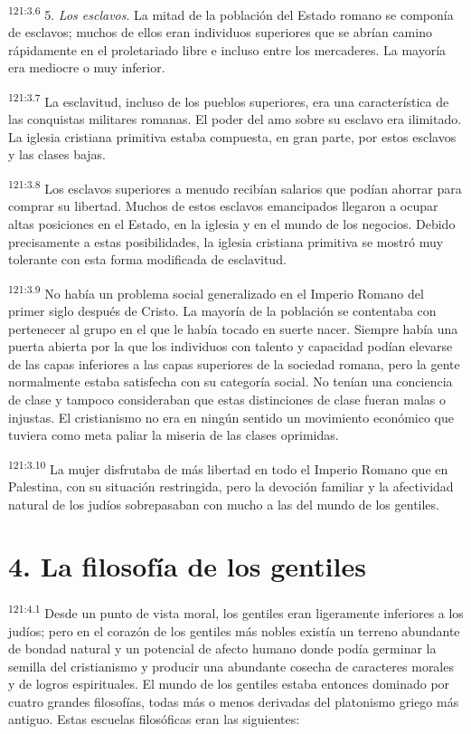 \par
\textsuperscript{121:3.6} 5. \textit{Los esclavos}. La mitad de la población del Estado romano se componía de esclavos; muchos de ellos eran individuos superiores que se abrían camino rápidamente en el proletariado libre e incluso entre los mercaderes. La mayoría era mediocre o muy inferior.

\par
\textsuperscript{121:3.7} La esclavitud, incluso de los pueblos superiores, era una característica de las conquistas militares romanas. El poder del amo sobre su esclavo era ilimitado. La iglesia cristiana primitiva estaba compuesta, en gran parte, por estos esclavos y las clases bajas.

\par
\textsuperscript{121:3.8} Los esclavos superiores a menudo recibían salarios que podían ahorrar para comprar su libertad. Muchos de estos esclavos emancipados llegaron a ocupar altas posiciones en el Estado, en la iglesia y en el mundo de los negocios. Debido precisamente a estas posibilidades, la iglesia cristiana primitiva se mostró muy tolerante con esta forma modificada de esclavitud.

\par
\textsuperscript{121:3.9} No había un problema social generalizado en el Imperio Romano del primer siglo después de Cristo. La mayoría de la población se contentaba con pertenecer al grupo en el que le había tocado en suerte nacer. Siempre había una puerta abierta por la que los individuos con talento y capacidad podían elevarse de las capas inferiores a las capas superiores de la sociedad romana, pero la gente normalmente estaba satisfecha con su categoría social. No tenían una conciencia de clase y tampoco consideraban que estas distinciones de clase fueran malas o injustas. El cristianismo no era en ningún sentido un movimiento económico que tuviera como meta paliar la miseria de las clases oprimidas.

\par
\textsuperscript{121:3.10} La mujer disfrutaba de más libertad en todo el Imperio Romano que en Palestina, con su situación restringida, pero la devoción familiar y la afectividad natural de los judíos sobrepasaban con mucho a las del mundo de los gentiles.

\section*{4. La filosofía de los gentiles}
\par
\textsuperscript{121:4.1} Desde un punto de vista moral, los gentiles eran ligeramente inferiores a los judíos; pero en el corazón de los gentiles más nobles existía un terreno abundante de bondad natural y un potencial de afecto humano donde podía germinar la semilla del cristianismo y producir una abundante cosecha de caracteres morales y de logros espirituales. El mundo de los gentiles estaba entonces dominado por cuatro grandes filosofías, todas más o menos derivadas del platonismo griego más antiguo. Estas escuelas filosóficas eran las siguientes:

